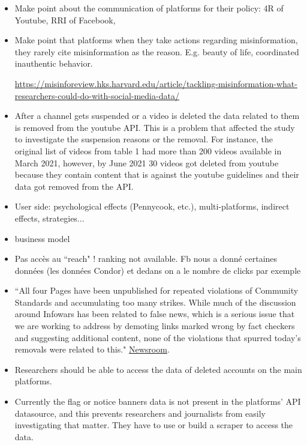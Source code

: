 \documentclass{article}
\begin{document}
{\begin{itemize}
	\item Make point about the communication of platforms for their policy: 4R of Youtube, RRI of Facebook, 

	\item Make point that platforms when they take actions regarding misinformation, they rarely cite misinformation as the reason. E.g. beauty of life, coordinated inauthentic behavior. 

\href{https://misinforeview.hks.harvard.edu/article/tackling-misinformation-what-researchers-could-do-with-social-media-data/}{https://misinforeview.hks.harvard.edu/article/tackling-misinformation-what-researchers-could-do-with-social-media-data/}

	\item After a channel gets suspended or a video is deleted the data related to them is removed from the youtube API. This is a problem that affected the study to investigate the suspension reasons or the removal. For instance, the original list of videos from table 1 had more than 200 videos available in March 2021, however, by June 2021 30 videos got deleted from youtube because they contain content that is against the youtube guidelines and their data got removed from the API. 
	
	\item User side: psychological effects (Pennycook, etc.), multi-platforms, indirect effects, strategies... 
	
	\item business model 
	
	\item Pas accès au ``reach" !  ranking not available. Fb nous a donné certaines données (les données Condor) et dedans on a le nombre de clicks par exemple
	
	\item ``All four Pages have been unpublished for repeated violations of Community Standards and accumulating too many strikes. While much of the discussion around Infowars has been related to false news, which is a serious issue that we are working to address by demoting links marked wrong by fact checkers and suggesting additional content, none of the violations that spurred today’s removals were related to this." \href{https://about.fb.com/news/2018/08/enforcing-our-community-standards/}{Newsroom}.
	\item Researchers should be able to access the data of deleted accounts on the main platforms.

	\item Currently the flag or notice banners data is not present in the platforms’ API datasource, and this prevents researchers and journalists from easily investigating that matter. They have to use or build a scraper to access the data.


\end{itemize}}
\end{document}
